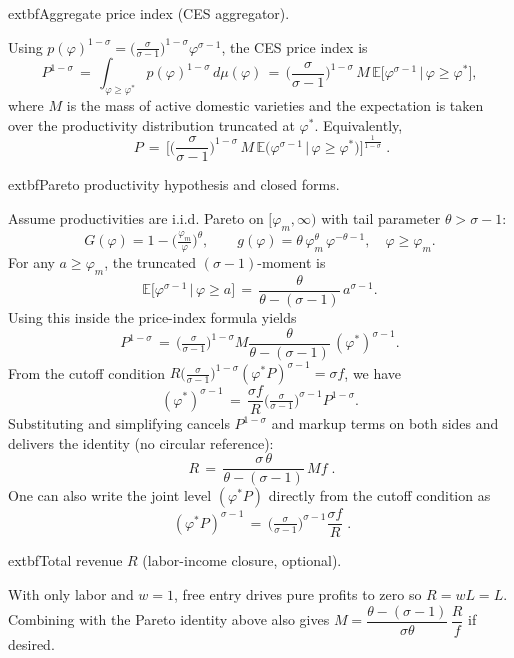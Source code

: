 \begin{solution}
        \bigskip
        	extbf{Aggregate price index (CES aggregator).}
    
    Using $p(\varphi)^{1-\sigma}=\big(\tfrac{\sigma}{\sigma-1}\big)^{1-\sigma} \varphi^{\sigma-1}$, the CES price index is
    \[
        P^{1-\sigma} \,=\, \int_{\varphi\ge \varphi^*} p(\varphi)^{1-\sigma}\, d\mu(\varphi)
        \,=\, \Big(\frac{\sigma}{\sigma-1}\Big)^{1-\sigma}\, M\, \mathbb{E}\big[\varphi^{\sigma-1}\,\big|\,\varphi\ge \varphi^*\big],
    \]
    where $M$ is the mass of active domestic varieties and the expectation is taken over the productivity distribution truncated at $\varphi^*$. Equivalently,
    \[
        \boxed{\;\displaystyle P \,=\, \Big[\Big(\frac{\sigma}{\sigma-1}\Big)^{1-\sigma}\, M\, \mathbb{E}\big(\varphi^{\sigma-1}\,\big|\,\varphi\ge \varphi^*\big)\Big]^{\!\tfrac{1}{1-\sigma}}\; }.
    \]
    
        \bigskip
        	extbf{Pareto productivity hypothesis and closed forms.}

    Assume productivities are i.i.d. Pareto on $[\varphi_m,\infty)$ with tail parameter $\theta>\sigma-1$:
    \[
        G(\varphi)=1-\Big(\tfrac{\varphi_m}{\varphi}\Big)^{\!\theta},\qquad g(\varphi)=\theta\,\varphi_m^{\theta}\,\varphi^{-\theta-1},\quad \varphi\ge\varphi_m.
    \]
    For any $a\ge\varphi_m$, the truncated $(\sigma-1)$-moment is
    \[
        \mathbb{E}\big[\varphi^{\sigma-1}\,\big|\,\varphi\ge a\big] \,=\, \frac{\theta}{\theta-(\sigma-1)}\, a^{\sigma-1}.
    \]
    Using this inside the price-index formula yields
    \[
        P^{1-\sigma} \,=\, \Big(\tfrac{\sigma}{\sigma-1}\Big)^{1-\sigma} M \frac{\theta}{\theta-(\sigma-1)}\, (\varphi^*)^{\sigma-1}.
    \]
    From the cutoff condition $R\Big(\tfrac{\sigma}{\sigma-1}\Big)^{1-\sigma} (\varphi^* P)^{\sigma-1}=\sigma f$, we have
    \[
        (\varphi^*)^{\sigma-1} \,=\, \frac{\sigma f}{R}\Big(\tfrac{\sigma}{\sigma-1}\Big)^{\!\sigma-1} P^{1-\sigma}.
    \]
    Substituting and simplifying cancels $P^{1-\sigma}$ and markup terms on both sides and delivers the identity (no circular reference):
    \[
        \boxed{\; R \,=\, \frac{\sigma\,\theta}{\theta-(\sigma-1)}\, M f \; }.
    \]
    One can also write the joint level $(\varphi^* P)$ directly from the cutoff condition as
    \[
        \boxed{\; (\varphi^* P)^{\sigma-1} \,=\, \Big(\tfrac{\sigma}{\sigma-1}\Big)^{\!\sigma-1} \frac{\sigma f}{R} \; }.
    \]

        \bigskip
        	extbf{Total revenue $R$ (labor-income closure, optional).}

    With only labor and $w=1$, free entry drives pure profits to zero so $R=wL=L$. Combining with the Pareto identity above also gives $M=\dfrac{\theta-(\sigma-1)}{\sigma\theta}\,\dfrac{R}{f}$ if desired.
    

\end{solution}

